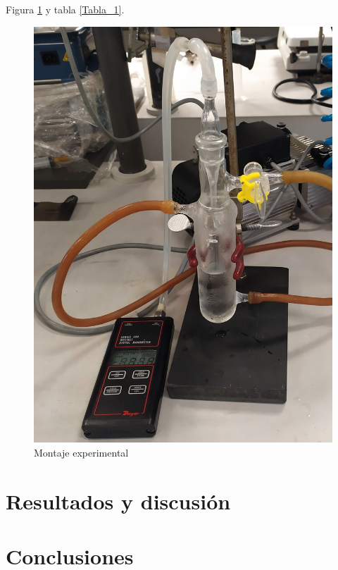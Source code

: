 \documentclass[11pt,fleqn]{article} %
\begin{document}
\begin{multicols}{2}
		Figura \ref{Montaje_exp} y tabla \ref{Tabla_1}.
		
		\linimg
		\begin{figure}[H]
			\centering
			\includegraphics[scale=0.05]{Imagenes/Montaje.png}
			\caption{Montaje experimental} 
			\label{Montaje_exp}	
			\linimg
		\end{figure}
				
		\section{Resultados y discusión}
				
		\section{Conclusiones} 	 
		 
		
	\end{multicols}	
\end{document}
